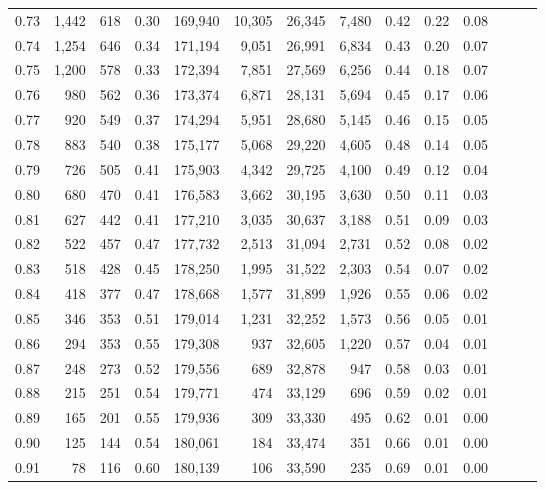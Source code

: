 \begin{tabular}{rrrrrrrrrrrrrr}
0.73 &  1,442 &  618 &  0.30 &  169,940 &   10,305 &  26,345 &   7,480 &  0.42 &  0.22 &      0.08 \\
0.74 &  1,254 &  646 &  0.34 &  171,194 &    9,051 &  26,991 &   6,834 &  0.43 &  0.20 &      0.07 \\
0.75 &  1,200 &  578 &  0.33 &  172,394 &    7,851 &  27,569 &   6,256 &  0.44 &  0.18 &      0.07 \\
0.76 &    980 &  562 &  0.36 &  173,374 &    6,871 &  28,131 &   5,694 &  0.45 &  0.17 &      0.06 \\
0.77 &    920 &  549 &  0.37 &  174,294 &    5,951 &  28,680 &   5,145 &  0.46 &  0.15 &      0.05 \\
0.78 &    883 &  540 &  0.38 &  175,177 &    5,068 &  29,220 &   4,605 &  0.48 &  0.14 &      0.05 \\
0.79 &    726 &  505 &  0.41 &  175,903 &    4,342 &  29,725 &   4,100 &  0.49 &  0.12 &      0.04 \\
0.80 &    680 &  470 &  0.41 &  176,583 &    3,662 &  30,195 &   3,630 &  0.50 &  0.11 &      0.03 \\
0.81 &    627 &  442 &  0.41 &  177,210 &    3,035 &  30,637 &   3,188 &  0.51 &  0.09 &      0.03 \\
0.82 &    522 &  457 &  0.47 &  177,732 &    2,513 &  31,094 &   2,731 &  0.52 &  0.08 &      0.02 \\
0.83 &    518 &  428 &  0.45 &  178,250 &    1,995 &  31,522 &   2,303 &  0.54 &  0.07 &      0.02 \\
0.84 &    418 &  377 &  0.47 &  178,668 &    1,577 &  31,899 &   1,926 &  0.55 &  0.06 &      0.02 \\
0.85 &    346 &  353 &  0.51 &  179,014 &    1,231 &  32,252 &   1,573 &  0.56 &  0.05 &      0.01 \\
0.86 &    294 &  353 &  0.55 &  179,308 &      937 &  32,605 &   1,220 &  0.57 &  0.04 &      0.01 \\
0.87 &    248 &  273 &  0.52 &  179,556 &      689 &  32,878 &     947 &  0.58 &  0.03 &      0.01 \\
0.88 &    215 &  251 &  0.54 &  179,771 &      474 &  33,129 &     696 &  0.59 &  0.02 &      0.01 \\
0.89 &    165 &  201 &  0.55 &  179,936 &      309 &  33,330 &     495 &  0.62 &  0.01 &      0.00 \\
0.90 &    125 &  144 &  0.54 &  180,061 &      184 &  33,474 &     351 &  0.66 &  0.01 &      0.00 \\
0.91 &     78 &  116 &  0.60 &  180,139 &      106 &  33,590 &     235 &  0.69 &  0.01 &      0.00 \\

\end{tabular}
